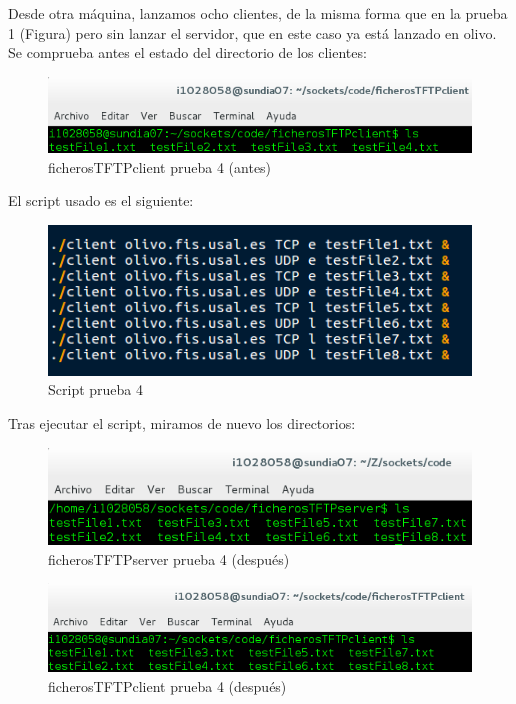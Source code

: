 \documentclass[journal, a4paper]{IEEEtran}
\begin{document}
Desde otra máquina, lanzamos ocho clientes, de la misma forma que en la prueba 1 (Figura) pero sin lanzar el servidor, que en este caso ya está lanzado en olivo.\\

Se comprueba antes el estado del directorio de los clientes:

\begin{figure}[H]
\centering
\includegraphics[scale=0.45]{images/client_before_4}
\caption{ficherosTFTPclient prueba 4 (antes)}
\end{figure}

 El script usado es el siguiente:
 
\begin{figure}[H]
\centering
\includegraphics[scale=0.6]{images/script_prueba_4}
\caption{Script prueba 4}
\end{figure}

Tras ejecutar el script, miramos de nuevo los directorios:

\begin{figure}[H]
\centering
\includegraphics[scale=0.45]{images/server_after_4}
\caption{ficherosTFTPserver prueba 4 (después)}
\end{figure}

\begin{figure}[H]
\centering
\includegraphics[scale=0.45]{images/client_after_4}
\caption{ficherosTFTPclient prueba 4 (después)}
\end{figure}
\end{document}
